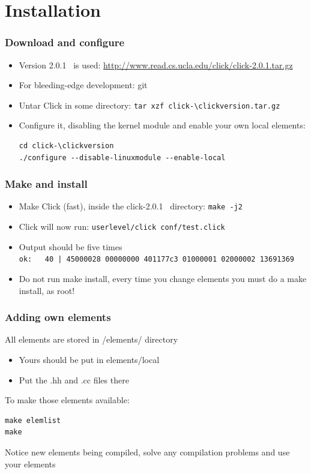 \documentclass{beamer}
\newcommand{\clickversion}{2.0.1}
\begin{document}
\section{Installation}
\begin{frame}[fragile]
\frametitle{Download and configure}
\begin{itemize}
	\item Version \clickversion~ is used: \url{http://www.read.cs.ucla.edu/click/click-\clickversion.tar.gz }
	\item For bleeding-edge development: git
	\item Untar Click in some directory: \lstinline!tar xzf click-\clickversion.tar.gz!
	\item Configure it, disabling the kernel module and enable your own local elements:
	\begin{lstlisting}
cd click-\clickversion
./configure --disable-linuxmodule --enable-local
\end{lstlisting}
\end{itemize}

\end{frame}
\begin{frame}[fragile]
	\frametitle{Make and install}
\begin{itemize}
	\item Make Click (fast), inside the click-\clickversion~ directory: \lstinline!make -j2!
	\item Click will now run: \lstinline!userlevel/click conf/test.click!
	\item Output should be five times \\ \lstinline!ok:   40 | 45000028 00000000 401177c3 01000001 02000002 13691369!
	\item Do not run make install, every time you change elements you must do a make install, as root!
\end{itemize}	
\end{frame}

\begin{frame}[fragile]
	\frametitle{Adding own elements}
All elements are stored in /elements/ directory
\begin{itemize}
	\item Yours should be put in elements/local
	\item Put the .hh and .cc files there
\end{itemize}
To make those elements available:
\begin{lstlisting}
make elemlist
make
\end{lstlisting}
Notice new elements being compiled, solve any compilation problems and use your elements
\end{frame}
\end{document}
